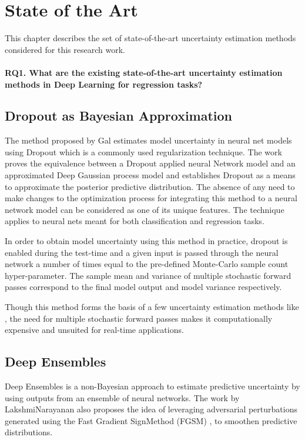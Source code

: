 

    \chapter{State of the Art}\label{chap_state_of_the_art}
    This chapter describes the set of state-of-the-art uncertainty estimation methods considered for this research work.
	\subsubsection{RQ1. What are the existing state-of-the-art uncertainty estimation methods in Deep Learning for regression tasks?}
	\section{Dropout as Bayesian Approximation}
	The method proposed by Gal {\etal} \cite{gal2016dropout} estimates model uncertainty in neural net models using Dropout \cite{srivastava2014dropout} which is a commonly used regularization technique. The work proves the equivalence between a Dropout applied neural Network model and an approximated Deep Gaussian process model and establishes Dropout as a means to approximate the posterior predictive distribution. The absence of any need to make changes to the optimization process for integrating this method to a neural network model can be considered as one of its unique features. The technique applies to neural nets meant for both classification and regression tasks. 
	
	In order to obtain model uncertainty using this method in practice, dropout is enabled during the test-time and a given input is passed through the neural network a number of times equal to the pre-defined Monte-Carlo sample count hyper-parameter. The sample mean and variance of multiple stochastic forward passes correspond to the final model output and model variance respectively. 
	
	Though this method forms the basis of a few uncertainty estimation methods like \cite{loquercio2020a}, the need for multiple stochastic forward passes makes it computationally expensive and unsuited for real-time applications.
	
	\section{Deep Ensembles}
	  Deep Ensembles \cite{lakshminarayanan2017simple} is a non-Bayesian approach to estimate predictive uncertainty by using outputs from an ensemble of neural networks. The work by LakshmiNarayanan {\etal}  also proposes the idea of leveraging adversarial perturbations generated using the Fast Gradient SignMethod (FGSM) \cite{goodfellow2015explaining}, to smoothen predictive distributions.
	  
